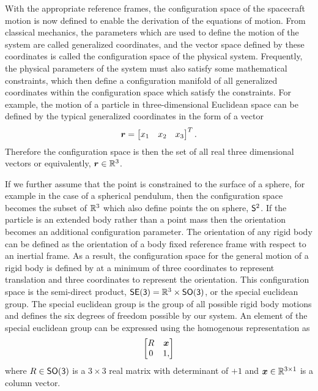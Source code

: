 With the appropriate reference frames, the configuration space of the spacecraft motion is now defined to enable the derivation of the equations of motion.
From classical mechanics, the parameters which are used to define the motion of the system are called generalized coordinates, and the vector space defined by these coordinates is called the configuration space of the physical system.
Frequently, the physical parameters of the system must also satisfy some mathematical constraints, which then define a configuration manifold of all generalized coordinates within the configuration space which satisfy the constraints.
For example, the motion of a particle in three-dimensional Euclidean space can be defined by the typical generalized coordinates in the form of a vector
\begin{align*}
    \vb{r} = \begin{bmatrix}
        x_1 & x_2 & x_3
    \end{bmatrix}^T.
\end{align*}
Therefore the configuration space is then the set of all real three dimensional vectors or equivalently, \(\vb{r} \in \R^3\).

If we further assume that the point is constrained to the surface of a sphere, for example in the case of a spherical pendulum, then the configuration space becomes the subset of \( \R^3 \) which also define points the on sphere, \( \S^2 \).
If the particle is an extended body rather than a point mass then the orientation becomes an additional configuration parameter.
The orientation of any rigid body can be defined as the orientation of a body fixed reference frame with respect to an inertial frame. 
As a result, the configuration space for the general motion of a rigid body is defined by at a minimum of three coordinates to represent translation and three coordinates to represent the orientation.
This configuration space is the semi-direct product, \(\SE = \R^3 \times \SO \), or the special euclidean group.
The special euclidean group is the group of all possible rigid body motions and defines the six degrees of freedom possible by our system.
An element of the special euclidean group can be expressed using the homogenous representation as
\begin{align*}
    \begin{bmatrix}
        R & \vb{x} \\
        0 & 1,
    \end{bmatrix}
\end{align*}
where \( R \in \SO\) is a \( 3 \times 3 \) real matrix with determinant of \( +1\) and \( \vb{x} \in \R^{3 \times 1}\) is a column vector.


